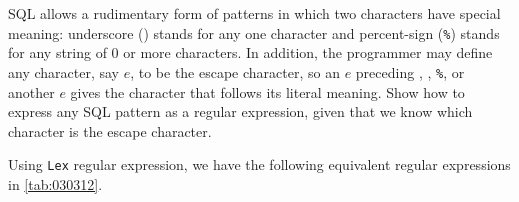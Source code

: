 \begin{exercise}\label{ex:030312}
    SQL allows a rudimentary form of patterns in which two characters have 
    special meaning: underscore (\texttt{\textunderscore}) stands for any one 
    character and percent-sign (\texttt{\%}) stands for any string of 0 or more 
    characters. In addition, the programmer may define any character, say $e$, 
    to be the escape character, so an $e$ preceding , \texttt{\textunderscore}, 
    \texttt{\%}, or another $e$ gives the character that follows its literal 
    meaning. Show how to express any SQL pattern as a regular expression, given 
    that we know which character is the escape character.
\end{exercise}
\begin{solution}\label{sol:030312}
    Using \texttt{Lex} regular expression, we have the following equivalent 
    regular expressions in \autoref{tab:030312}.
    
\end{solution}